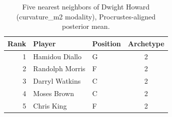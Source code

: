 \begin{table}[htbp]
  \centering\small
  \begin{tabular}{rllc}
    \toprule
    Rank & Player & Position & Archetype \\
    \midrule
    1 & Hamidou Diallo & G & 2 \\
    2 & Randolph Morris & F & 2 \\
    3 & Darryl Watkins & C & 2 \\
    4 & Moses Brown & C & 2 \\
    5 & Chris King & F & 2 \\
    \bottomrule
  \end{tabular}
  \caption{Five nearest neighbors of Dwight Howard (curvature_m2 modality), Procrustes-aligned posterior mean.}
  \label{tab:Dwight_Howard_neighbors_curvature_m2}
\end{table}

